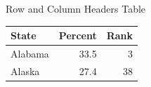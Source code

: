 \documentclass[14pt,t]{beamer}
\begin{document}
\begin{frame}{Row and Column Headers Table}
\begin{table}
\centering
\begin{tabular}{lrr}
\hline
State & Percent & Rank \\
\hline
Alabama & 33.5 & 3 \\
Alaska & 27.4 & 38 \\
\hline
\end{tabular}
\end{table}
\end{frame}
\end{document}
